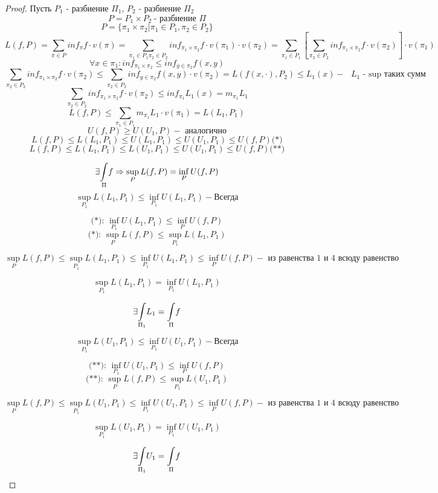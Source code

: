     \begin{proof}
        \par Пусть $P_1$ - разбиение $\Pi_1$, $P_2$ - разбиение $\Pi_2$
        $$P = P_1 \times P_2 \ \text{- разбиение } \Pi$$ 
        $$P = \{\pi_1 \times \pi_2 | \pi_1 \in P_1, \pi_2 \in P_2\}$$
        $$L(f, P) = \sum\limits_{\pi \in P} inf_{\pi} f \cdot v(\pi) = \sum\limits_{\pi_1 \in P_1 \pi_2 \in P_2} inf_{\pi_1 \times \pi_2} f \cdot v(\pi_1) \cdot v(\pi_2) = \sum\limits_{\pi_1 \in P_1} \left[ \sum\limits_{\pi_2 \in P_2} inf_{\pi_1 \times \pi_2} f \cdot v(\pi_2) \right] \cdot v(\pi_1)$$
        $$\forall x\in \pi_1: inf_{\pi_1 \times \pi_2} \le inf_{y \in \pi_2} f(x, y)$$
        $$\sum\limits_{\pi_2 \in P_2} inf_{\pi_1 \times \pi_2} f \cdot v(\pi_2) \le \sum\limits_{\pi_2 \in P_2} inf_{y \in \pi_2} f(x,y) \cdot v(\pi_2) = L(f(x, \cdot), P_2) \le L_1 (x) - \text{ $L_1$ - sup таких сумм} $$
        $$\sum\limits_{\pi_2 \in P_2} inf_{\pi_1 \times \pi_2} f \cdot v(\pi_2) \le inf_{\pi_1} L_1(x) = m_{\pi_1} L_1$$
        $$L(f, P) \le \sum\limits_{\pi_1 \in P_1} m_{\pi_1} L_1 \cdot v(\pi_1) = L(L_1, P_1)$$
        $$U(f, P) \ge U(U_1, P) - \text{ аналогично}$$
        $$L(f, P) \le L(L_1, P_1) \le U(L_1, P_1) \le U(U_1, P_1) \le U(f, P) \text{(*)} $$
        $$L(f, P) \le L(L_1, P_1) \le L(U_1, P_1) \le U(U_1, P_1) \le U(f, P) \text{(**)}$$

        $$\exists \underset{\Pi}{\int} f \Rightarrow \sup_{P} L(f, P) = \inf_{P} U(f, P)$$
        $$\sup_{P_1} L(L_1, P_1) \le \inf_{P_1} U(L_1, P_1) - \text{Всегда}$$
        
        $$\text{(*): } \inf_{P_1} U(L_1, P_1) \le \inf_{P} U(f, P)$$
        $$\text{(*): } \sup_{P} L(f, P) \le \sup_{P_1} L(L_1, P_1)$$

        $$\sup_{P} L(f, P) \le \sup_{P_1} L(L_1, P_1) \le \inf_{P_1} U(L_1, P_1) \le \inf_{P} U(f, P) - \text{ из равенства 1 и 4 всюду равенство}$$

        $$\sup_{P_1} L(L_1, P_1) = \inf_{P_1} U(L_1, P_1)$$

        $$\exists \underset{\Pi_1}{\int} L_1 = \underset{\Pi}{\int} f$$

        $$\sup_{P_1} L(U_1, P_1) \le \inf_{P_1} U(U_1, P_1) - \text{Всегда}$$
        
        $$\text{(**): } \inf_{P_1} U(U_1, P_1) \le \inf_{P} U(f, P)$$
        $$\text{(**): } \sup_{P} L(f, P) \le \sup_{P_1} L(U_1, P_1)$$

        $$\sup_{P} L(f, P) \le \sup_{P_1} L(U_1, P_1) \le \inf_{P_1} U(U_1, P_1) \le \inf_{P} U(f, P) - \text{ из равенства 1 и 4 всюду равенство}$$

        $$\sup_{P_1} L(U_1, P_1) = \inf_{P_1} U(U_1, P_1)$$

        $$\exists \underset{\Pi_1}{\int} U_1 = \underset{\Pi}{\int} f$$



    \end{proof}


